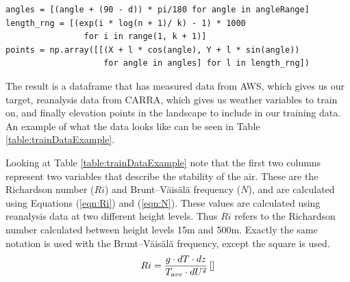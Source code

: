 \begin{lstlisting}[style = Python, caption = {Sector elevation points generated}, label = code:sectorElevation]
angles = [(angle + (90 - d)) * pi/180 for angle in angleRange]
length_rng = [(exp(i * log(n + 1)/ k) - 1) * 1000 
                for i in range(1, k + 1)]
points = np.array([[(X + l * cos(angle), Y + l * sin(angle))
                    for angle in angles] for l in length_rng])   
\end{lstlisting}

The result is a dataframe that has measured data from AWS, which gives us our target, reanalysis data from CARRA, which gives us weather variables to train on, and finally elevation points in the landscape to include in our training data. An example of what the data looks like can be seen in Table \ref{table:trainDataExample}.

\begin{table}[h]
    \caption[An example of data structure used to train model]{An example of data structure used to train model. Data points include the derived variables Ri and N, the elevation of the station, direction of wind and relative direction of the wind (twd, that is the direction of the wind relative to center of Iceland), along with some combination of wind speed, pressure and temperature at the different height levels. Finally there are the elevation points around a given station, where the elevation is relative to the station.}
    \label{table:trainDataExample}
\end{table}

 Looking at Table \ref{table:trainDataExample} note that the first two columns represent two variables that describe the stability of the air. These are the Richardson number ($Ri$)\cite{richardson_number_skybrary} and Brunt–Väisälä frequency\cite{brunt_vaisala_freq_eumtrain} ($N$), and are calculated using Equations (\ref{eqn:Ri}) and (\ref{eqn:N})\cite{mean_gust_HA_HO}. These values are calculated using reanalysis data at two different height levels. Thus $Ri$ refers to the Richardson number calculated between height levels 15m and 500m. Exactly the same notation is used with the Brunt–Väisälä frequency, except the square is used.
\begin{equation}
    \label{eqn:Ri}
    Ri = \frac{g \cdot dT \cdot dz}{T_{\textrm ave} \cdot dU^2} \, \mathrm{[]}
\end{equation}

